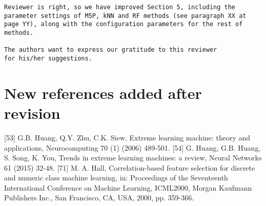 \documentclass[preprint]{elsarticle}
\begin{document}
\begin{verbatim}
Reviewer is right, so we have improved Section 5, including the 
parameter settings of M5P, kNN and RF methods (see paragraph XX at 
page YY), along with the configuration parameters for the rest of 
methods.

The authors want to express our gratitude to this reviewer 
for his/her suggestions.
\end{verbatim}



\section{New references added after revision}

[53] G.B. Huang, Q.Y. Zhu, C.K. Siew, Extreme learning machine: theory and applications, Neurocomputing 70 (1) (2006) 489-501.
[54] G. Huang, G.B. Huang, S. Song, K. You, Trends in extreme learning machines: a review, Neural Networks 61 (2015) 32-48.
[71] M. A. Hall, Correlation-based feature selection for discrete and numeric class machine learning, in: Proceedings of the Seventeenth International Conference on Machine Learning, ICML2000, Morgan Kaufmann Publishers Inc., San Francisco, CA, USA, 2000, pp. 359-366.

\cite{wiki:dewey}
\end{document}
